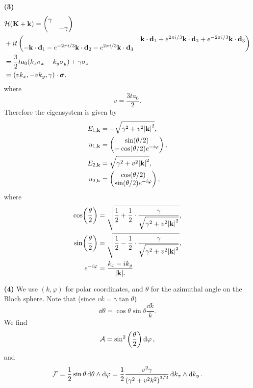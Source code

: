 \documentclass{article}
\makeatletter
\newcommand*{\shifttext}[1]{%
  \settowidth{\@tempdima}{#1}%
  \hspace{-\@tempdima}#1%
}
\newcommand{\plabel}[1]{%
\shifttext{\textbf{#1}\quad}%
}
\newcommand{\minusbaseline}{\abovedisplayskip=0pt\abovedisplayshortskip=0pt~\vspace*{-\baselineskip}}%
\makeatother
\begin{document}
\plabel{(3)}%
\begingroup\minusbaseline%
\begin{align*}
  & \mathcal{H}(\vb{K} + \vb{k}) = \begin{pmatrix}
    \gamma & \\ & -\gamma
  \end{pmatrix} \\
  &{} + it \begin{pmatrix}
    & \vb{k}\cdot \vb{d}_1 + e^{2\pi i/3} \vb{k}\cdot \vb{d}_2 + e^{-2\pi i/3} \vb{k} \cdot \vb{d}_3 \\
    -\vb{k}\cdot \vb{d}_1 - e^{-2\pi i/3} \vb{k}\cdot \vb{d}_2 - e^{2\pi i/3} \vb{k} \cdot \vb{d}_3 &
  \end{pmatrix} \\
  &=  \frac{3}{2} t a_0 (k_x \sigma_x - k_y \sigma_y) + \gamma \sigma_z \\
  &= \qty(v k_x, -v k_y, \gamma) \cdot \vb*{\sigma},
\end{align*}
\endgroup
where
\[ v = \frac{3t a_0}{2}. \]
Therefore the eigensystem is given by
\begin{align*}
  E_{1,\vb{k}} &= -\sqrt{\gamma^2 + v^2 \abs{\vb{k}}^2}, \\
  u_{1,\vb{k}} &= \begin{pmatrix}
    \sin(\theta/2) \\ -\cos(\theta/2) e^{-i\varphi} 
  \end{pmatrix}, \\
  E_{2,\vb{k}} &= \sqrt{\gamma^2 + v^2 \abs{\vb{k}}^2}, \\
  u_{2,\vb{k}} &= \begin{pmatrix}
    \cos(\theta/2) \\ \sin(\theta/2) e^{-i\varphi}
  \end{pmatrix},
\end{align*}
where
\begin{align*}
  \cos(\frac{\theta}{2}) &= \sqrt{\frac{1}{2} + \frac{1}{2} \cdot \frac{\gamma}{\sqrt{\gamma^2 + v^2 \abs{\vb{k}}^2}}}, \\
  \sin(\frac{\theta}{2}) &= \sqrt{\frac{1}{2} - \frac{1}{2} \cdot \frac{\gamma}{\sqrt{\gamma^2 + v^2 \abs{\vb{k}}^2}}}, \\
  e^{-i\varphi} &= \frac{k_x - ik_y}{\abs{\vb{k}}.}
\end{align*}

\plabel{(4)}%
We use $(k,\varphi)$ for polar coordinates, and $\theta$ for the azimuthal angle on the Bloch sphere.
Note that (since $vk = \gamma \tan \theta$)
\[ \dd{\theta} = \cos\theta \sin\theta \frac{\dd{k}}{k}. \]
We find
\[ \mathcal{A} = \sin^2\qty(\frac{\theta}{2}) \dd{\varphi}, \]
and
\[ \mathcal{F} = \frac{1}{2} \sin\theta \dd{\theta}\wedge \dd{\varphi} = \frac{1}{2} \frac{v^2 \gamma}{\qty(\gamma^2+v^2 k^2)^{3/2}} \dd{k_x} \wedge \dd{k_y}. \]
\end{document}
